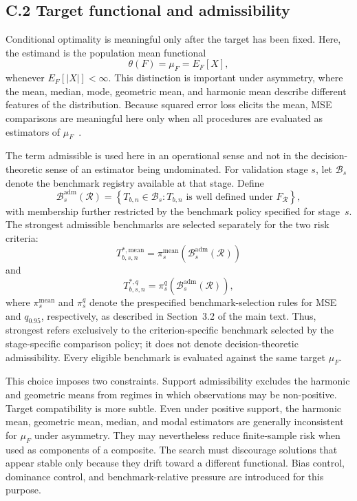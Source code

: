 \subsection*{C.2 Target functional and admissibility}

Conditional optimality is meaningful only after the target has been fixed. Here, the estimand is the population mean functional
\[
\theta(F)=\mu_F=E_F[X],
\]
whenever $E_F[|X|]<\infty$. This distinction is important under asymmetry, where the mean, median, mode, geometric mean, and harmonic mean describe different features of the distribution. Because squared error loss elicits the mean, MSE comparisons are meaningful here only when all procedures are evaluated as estimators of $\mu_F$~\citep{gneiting2011point}.

The term admissible is used here in an operational sense and not in the decision-theoretic sense of an estimator being undominated. For validation stage $s$, let $\mathcal{B}_s$ denote the benchmark registry available at that stage. Define
\[
\mathcal{B}^{\mathrm{adm}}_s(\mathcal{R})
=
\left\{
T_{b,n}\in\mathcal{B}_s:
T_{b,n}\text{ is well defined under }F_{\mathcal{R}}
\right\},
\]
with membership further restricted by the benchmark policy specified for stage~$s$.
The strongest admissible benchmarks are selected separately for the two risk criteria:
\[
T^{*,\mathrm{mean}}_{b,s,n}
=
\pi^{\mathrm{mean}}_s
\left(
\mathcal{B}^{\mathrm{adm}}_s(\mathcal{R})
\right)
\]
and
\[
T^{*,q}_{b,s,n}
=
\pi^{q}_s
\left(
\mathcal{B}^{\mathrm{adm}}_s(\mathcal{R})
\right),
\]
where \(\pi^{\mathrm{mean}}_s\) and \(\pi^{q}_s\) denote the prespecified benchmark-selection rules for MSE and \(q_{0.95}\), respectively, as described in Section~3.2 of the main text. Thus, strongest refers exclusively to the criterion-specific benchmark selected by the stage-specific comparison policy; it does not denote decision-theoretic admissibility. Every eligible benchmark is evaluated against the same target \(\mu_F\).

This choice imposes two constraints. Support admissibility excludes the harmonic and geometric means from regimes in which observations may be non-positive. Target compatibility is more subtle. Even under positive support, the harmonic mean, geometric mean, median, and modal estimators are generally inconsistent for $\mu_F$ under asymmetry. They may nevertheless reduce finite-sample risk when used as components of a composite. The search must discourage solutions that appear stable only because they drift toward a different functional. Bias control, dominance control, and benchmark-relative pressure are introduced for this purpose.

